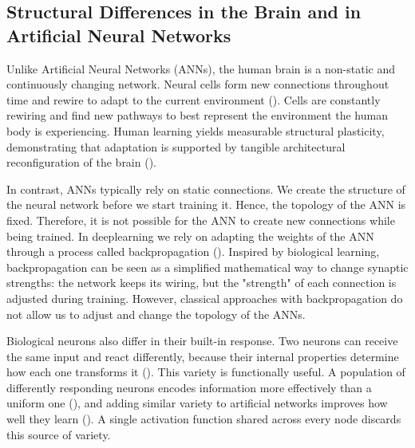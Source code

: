 \documentclass[12pt]{article}
\begin{document}
\subsection{Structural Differences in the Brain and in Artificial Neural Networks}
\label{subsec:structural-differences-in-the-brain-and}


Unlike Artificial Neural Networks (ANNs), the human brain is a non-static and continuously changing network.
Neural cells form new connections throughout time and rewire to adapt to the current environment (\cite{pascualleone_plastic_2005,holtmaat_experience-dependent_2009}).
Cells are constantly rewiring and find new pathways to best represent the environment the human body is experiencing.
Human learning yields measurable structural plasticity, demonstrating that adaptation is supported by tangible architectural reconfiguration of the brain (\cite{draganski_changes_2004}).

In contrast, ANNs typically rely on static connections.
We create the structure of the neural network before we start training it.
Hence, the topology of the ANN is fixed.
Therefore, it is not possible for the ANN to create new connections while being trained.
In deeplearning we rely on adapting the weights of the ANN through a process called backpropagation (\cite{rumelhart_learning_1986}).
Inspired by biological learning, backpropagation can be seen as a simplified mathematical way to change synaptic strengths: the network keeps its wiring, but the "strength" of each connection is adjusted during training.
However, classical approaches with backpropagation do not allow us to adjust and change the topology of the ANNs.

Biological neurons also differ in their built-in response.
Two neurons can receive the same input and react differently, because their internal properties determine how each one transforms it (\cite{drion_ion_2015}).
This variety is functionally useful.
A population of differently responding neurons encodes information more effectively than a uniform one (\cite{tripathy_intermediate_2013}), and adding similar variety to artificial networks improves how well they learn (\cite{perez-nieves_neural_2021}).
A single activation function shared across every node discards this source of variety.



\end{document}
